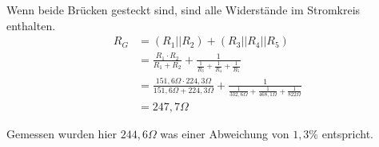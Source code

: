 \documentclass[
a4paper,     %
 headsepline, %
11pt         %
]{scrartcl}  %
\begin{document}
Wenn beide Brücken gesteckt sind, sind alle Widerstände im Stromkreis enthalten.
\begin{align}
R_G &= (R_1 || R_2) + (R_3 || R_4 || R_5) \nonumber \\
	&= \frac{R_1 \cdot R_2}{R_1+R_2} + \frac{1}{\frac{1}{R_3}+\frac{1}{R_4}+\frac{1}{R_5}} \nonumber \\
	&= \frac{151,6 \Omega \cdot 224,3 \Omega}{151,6 \Omega + 224,3 \Omega} + \frac{1}{\frac{1}{332,6 \Omega}+\frac{1}{468,1 \Omega}+\frac{1}{822 \Omega}}  \nonumber \\
	&= 247,7 \Omega \nonumber
\end{align}

Gemessen wurden hier $244,6 \Omega$ was einer Abweichung von $1,3\%$ entspricht.



% 

% 
\end{document}
